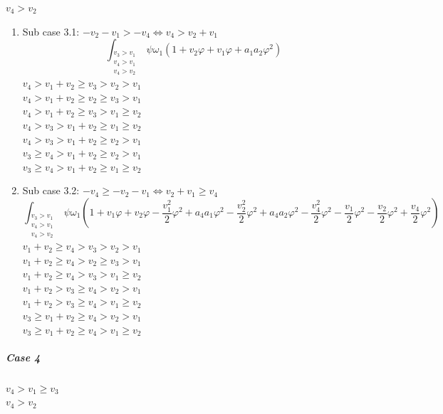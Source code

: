 \documentclass{article}
\begin{document}
$v_4>v_2$\\
\begin{enumerate}
    \item Sub case 3.1: $-v_2-v_1>-v_4\iff{v_4>v_2+v_1}$\\
    \[\int_{\substack{v_3>v_1\\v_4>v_1\\v_4>v_2}}\psi\omega_1\left(1+v_2\varphi+v_1\varphi+a_1a_2\varphi^2\right)\]
    $v_4>v_1+v_2\geq{v}_3>{v_2}>v_1$\\
$v_4>v_1+v_2\geq{v}_2\geq{v_3}>v_1$\\
$v_4>v_1+v_2\geq{v}_3>{v_1}\geq{v}_2$\\
$v_4>v_3>v_1+v_2\geq{v_1}\geq{v}_2$\\
$v_4>v_3>v_1+v_2\geq{v_2}>v_1$\\
$v_3\geq{v}_4>v_1+v_2\geq{v_2}>v_1$\\
$v_3\geq{v}_4>v_1+v_2\geq{v_1}\geq{v}_2$\\
    \item Sub case 3.2: $-v_4\geq-v_2-v_1\iff{v_2+v_1\geq{v}_4}$\\
    \[\int_{\substack{v_3>v_1\\v_4>v_1\\v_4>v_2}}\psi\omega_1\left(1+v_1\varphi+v_2\varphi-\frac{v_1^2}{2}\varphi^2+a_4a_1\varphi^2-\frac{v_2^2}{2}\varphi^2+a_4a_2\varphi^2-\frac{v_4^2}{2}\varphi^2-\frac{v_1}{2}\varphi^2-\frac{v_2}{2}\varphi^2+\frac{v_4}{2}\varphi^2\right)\]
$v_1+v_2\geq{v}_4>v_3>{v_2}>v_1$\\
$v_1+v_2\geq{v}_4>v_2\geq{v_3}>v_1$\\
$v_1+v_2\geq{v}_4>v_3>{v_1}\geq{v}_2$\\
$v_1+v_2>v_3\geq{v}_4>{v_2}>v_1$\\
$v_1+v_2>v_3\geq{v}_4>{v_1}\geq{v}_2$\\
$v_3\geq{v}_1+v_2\geq{v}_4>{v_2}>v_1$\\
$v_3\geq{v}_1+v_2\geq{v}_4>{v_1}\geq{v}_2$\\
    \end{enumerate}
    \subparagraph{Case 4}
$v_4>v_1\geq{v_3}$\\
$v_4>v_2$\\
\end{document}
